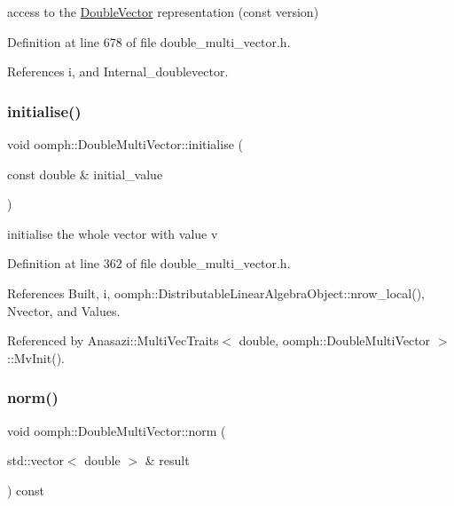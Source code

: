 access to the \hyperlink{classoomph_1_1DoubleVector}{Double\+Vector} representation (const version) 



Definition at line 678 of file double\+\_\+multi\+\_\+vector.\+h.



References i, and Internal\+\_\+doublevector.

\mbox{\label{classoomph_1_1DoubleMultiVector_a69f75b786cd1b2b45922075f1fa39de7}} 
\subsubsection{\texorpdfstring{initialise()}{initialise()}}
{\footnotesize\ttfamily void oomph\+::\+Double\+Multi\+Vector\+::initialise (\begin{DoxyParamCaption}\item[{const double \&}]{initial\+\_\+value }\end{DoxyParamCaption})\hspace{0.3cm}{\ttfamily [inline]}}



initialise the whole vector with value v 



Definition at line 362 of file double\+\_\+multi\+\_\+vector.\+h.



References Built, i, oomph\+::\+Distributable\+Linear\+Algebra\+Object\+::nrow\+\_\+local(), Nvector, and Values.



Referenced by Anasazi\+::\+Multi\+Vec\+Traits$<$ double, oomph\+::\+Double\+Multi\+Vector $>$\+::\+Mv\+Init().

\mbox{\label{classoomph_1_1DoubleMultiVector_a886c01ce65486490e3b3d38389182566}} 
\subsubsection{\texorpdfstring{norm()}{norm()}}
{\footnotesize\ttfamily void oomph\+::\+Double\+Multi\+Vector\+::norm (\begin{DoxyParamCaption}\item[{std\+::vector$<$ double $>$ \&}]{result }\end{DoxyParamCaption}) const\hspace{0.3cm}{\ttfamily [inline]}}



